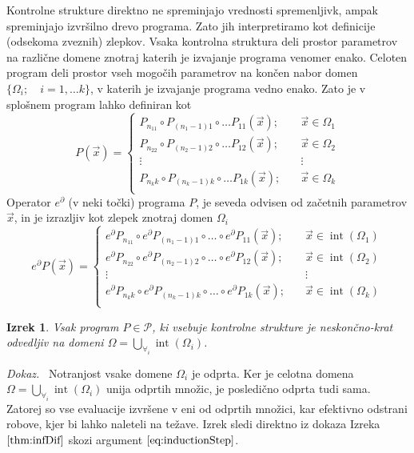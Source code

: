 \documentclass[a4paper, 12pt]{book}
\newcommand{\dP}{\mathcal{P}}
\newcommand{\D}{\partial}
\DeclareMathOperator{\interior}{int}
\newtheorem{izrek}{Izrek}[chapter]
\newenvironment{dokaz}{\emph{Dokaz.}\ }{\hspace{\fill}{$\Box$}}
\begin{document}
Kontrolne strukture direktno ne spreminjajo vrednosti spremenljivk, ampak spreminjajo izvršilno drevo programa. Zato jih interpretiramo kot definicije (odsekoma zveznih) zlepkov. Vsaka kontrolna struktura deli prostor parametrov na različne domene znotraj katerih je izvajanje programa venomer enako. Celoten program deli prostor vseh mogočih parametrov na končen nabor domen $\{\Omega_i;\quad i=1,\ldots
  k\}$, v katerih je izvajanje programa vedno enako. Zato je v splošnem program lahko definiran kot
\begin{equation}
   \label{eq:zlrprk_splosno}
   P(\vec{x}) =
   \begin{cases}
     P_{n_11}\circ P_{(n_1-1)1}\circ\ldots P_{11}(\vec{x});&\quad \vec{x}\in\Omega_1\\
     P_{n_22}\circ P_{(n_2-1)2}\circ\ldots P_{12}(\vec{x});&\quad \vec{x}\in\Omega_2\\
     \vdots&\quad\vdots\\
     P_{n_kk}\circ P_{(n_k-1)k}\circ\ldots P_{1k}(\vec{x});&\quad \vec{x}\in\Omega_k\\
   \end{cases}
 \end{equation}
 Operator $e^\D$ (v neki točki) programa $P$, je seveda odvisen od začetnih parametrov $\vec{x}$, in je izrazljiv kot zlepek znotraj domen $\Omega_i$
 \begin{equation}
   \label{eq:Dzlrprk_splosno}
   e^\D P({\vec{x}}) =
   \begin{cases}
     e^\D P_{n_11}\circ e^\D P_{(n_1-1)1}\circ\ldots\circ e^\D P_{11}(\vec{x});&\quad \vec{x}\in\interior(\Omega_1)\\
     e^\D P_{n_22}\circ e^\D P_{(n_2-1)2}\circ\ldots\circ e^\D P_{12}(\vec{x});&\quad \vec{x}\in\interior(\Omega_2)\\
     \vdots&\quad\vdots\\
     e^\D P_{n_kk}\circ e^\D P_{(n_k-1)k}\circ\ldots\circ e^\D P_{1k}(\vec{x});&\quad \vec{x}\in\interior(\Omega_k)\\
   \end{cases}
 \end{equation}

 \begin{izrek}\label{izr:diferentiableOnDomain}
 Vsak program $P\in\dP$, ki vsebuje kontrolne strukture je neskončno-krat odvedljiv na domeni $\Omega=\bigcup\limits_{\forall_i}\interior(\Omega_i)$.
 \end{izrek}
 \begin{dokaz}
  Notranjost vsake domene $\Omega_i$ je odprta. Ker je celotna domena $\Omega=\bigcup\limits_{\forall_i}\interior(\Omega_i)$ unija odprtih množic, je posledično odprta tudi sama. Zatorej so vse evaluacije izvršene v eni od odprtih množici, kar efektivno odstrani robove, kjer bi lahko naleteli na težave. Izrek sledi direktno iz dokaza Izreka $\ref{thm:infDif}$ skozi argument $\eqref{eq:inductionStep}$.
 \end{dokaz}
 
\end{document}
